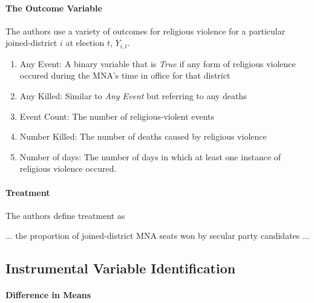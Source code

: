 \documentclass{scrartcl}
\begin{document}
\paragraph{The Outcome Variable} \label{outcome}


The authors use a variety of outcomes for religious violence for a particular joined-district $i$ at election $t$, $Y_{i,t}$.

\begin{enumerate}
\item Any Event: A binary variable that is \textit{True} if any form of religious violence occured during the MNA's time in office for that district
\item Any Killed: Similar to \textit{Any Event} but referring to any deaths
\item Event Count: The number of religious-violent events
\item Number Killed: The number of deaths caused by religious violence
\item Number of days: The number of days in which at least one instance of religious violence occured.
\end{enumerate}


\paragraph{Treatment} \label{treatment}

The authors define treatment as
\begin{displayquote}
... the proportion of joined-district MNA seats
  won by secular party candidates ...
\end{displayquote}



\subsection{Instrumental Variable Identification} \label{id}

\paragraph{Difference in Means}
\end{document}
